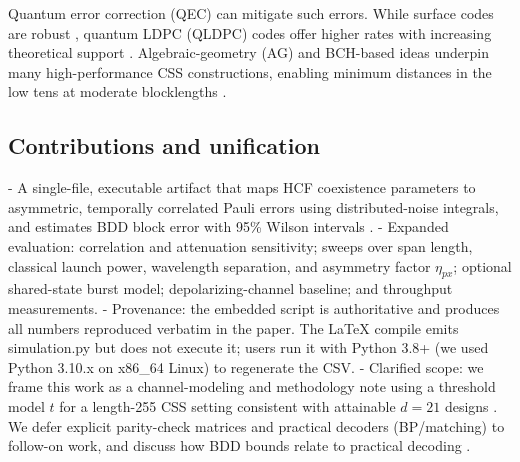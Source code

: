 \documentclass[conference]{IEEEtran}
\newcommand{\nexact}[1]{\num[round-mode=off]{#1}}
\newcommand{\simn}{255}
\begin{document}
Quantum error correction (QEC) can mitigate such errors. While surface codes are robust \cite{Fowler2012PRA}, quantum LDPC (QLDPC) codes offer higher rates with increasing theoretical support \cite{Kovalev2013PRA,TillichZemor2014TIT,BreuckmannEberhardt2021PRXQ,Panteleev2022STOC}. Algebraic-geometry (AG) and BCH-based ideas underpin many high-performance CSS constructions, enabling minimum distances in the low tens at moderate blocklengths \cite{Ashikhmin2001PRA,ChenLing2008TIT}.

\subsection*{Contributions and unification}
- A single-file, executable artifact that maps HCF coexistence parameters to asymmetric, temporally correlated Pauli errors using distributed-noise integrals, and estimates BDD block error with 95\% Wilson intervals \cite{Wilson1927JASA}.
- Expanded evaluation: correlation and attenuation sensitivity; sweeps over span length, classical launch power, wavelength separation, and asymmetry factor \(\eta_{px}\); optional shared-state burst model; depolarizing-channel baseline; and throughput measurements.
- Provenance: the embedded script is authoritative and produces all numbers reproduced verbatim in the paper. The LaTeX compile emits simulation.py but does not execute it; users run it with Python 3.8+ (we used Python 3.10.x on x86\_64 Linux) to regenerate the CSV.
- Clarified scope: we frame this work as a channel-modeling and methodology note using a threshold model \(t\) for a length-\nexact{\simn} CSS setting consistent with attainable \(d=21\) designs \cite{ChenLing2008TIT}. We defer explicit parity-check matrices and practical decoders (BP/matching) to follow-on work, and discuss how BDD bounds relate to practical decoding \cite{Higgott2021PyMatching,Valls2021IEEEAccess,Cross2007arXiv}.
\end{document}
